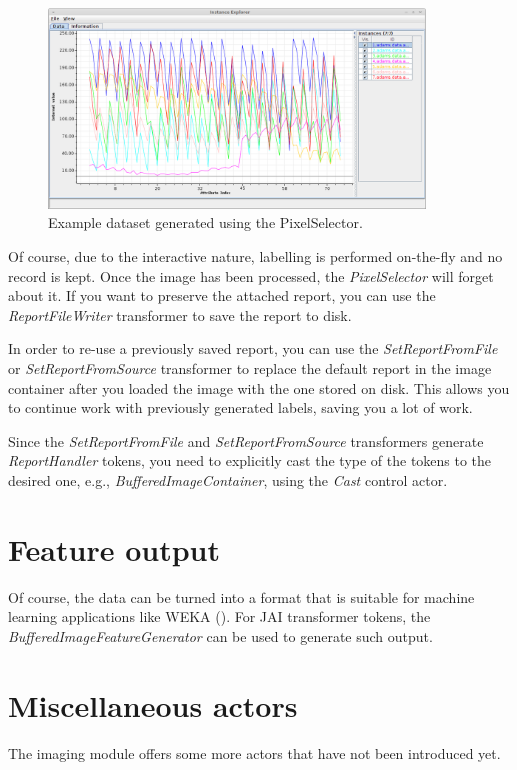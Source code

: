 \documentclass[a4paper]{book}
\begin{document}
\begin{figure}[htb]
  \centering
  \includegraphics[width=10.0cm]{images/pixelselector-dataset.png}
  \caption{Example dataset generated using the PixelSelector.}
  \label{pixelselector-dataset}
\end{figure}

Of course, due to the interactive nature, labelling is performed on-the-fly and
no record is kept. Once the image has been processed, the
\textit{PixelSelector} will forget about it. If you want to preserve the
attached report, you can use the \textit{ReportFileWriter} transformer to save
the report to disk. 

In order to re-use a previously saved report, you can use the
\textit{SetReportFromFile} or \textit{SetReportFromSource} transformer to
replace the default report in the image container after you loaded the image
with the one stored on disk. This allows you to continue work with previously
generated labels, saving you a lot of work.

Since the \textit{SetReportFromFile} and \textit{SetReportFromSource}
transformers generate \textit{ReportHandler} tokens, you need to explicitly
cast the type of the tokens to the desired one, e.g.,
\textit{BufferedImageContainer}, using the \textit{Cast} control actor.

\chapter{Feature output}
Of course, the data can be turned into a format that is suitable for machine 
learning applications like WEKA (\cite{weka}). For JAI transformer tokens, the
\textit{BufferedImageFeatureGenerator} can be used to generate such output.

\chapter{Miscellaneous actors}
The imaging module offers some more actors that have not been introduced yet.
\end{document}
